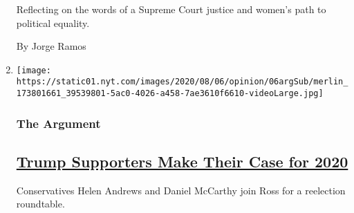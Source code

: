 \begin{enumerate}
  Reflecting on the words of a Supreme Court justice and women's path to
  political equality.

  By Jorge Ramos
\item
  \texttt{[image: https://static01.nyt.com/images/2020/08/06/opinion/06argSub/merlin\_173801661\_39539801-5ac0-4026-a458-7ae3610f6610-videoLarge.jpg]}

  \hypertarget{the-argument}{%
  \subsubsection{The Argument}\label{the-argument}}

  \hypertarget{trump-supporters-make-their-case-for-2020}{%
  \subsection{\texorpdfstring{\href{/2020/08/06/opinion/the-argument-trump-coronavirus-election.html}{Trump
  Supporters Make Their Case for
  2020}}{Trump Supporters Make Their Case for 2020}}\label{trump-supporters-make-their-case-for-2020}}

  Conservatives Helen Andrews and Daniel McCarthy join Ross for a
  reelection roundtable.
\end{enumerate}

